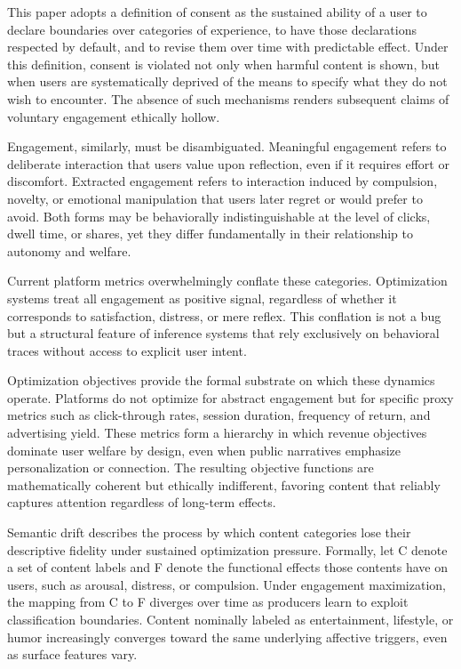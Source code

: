 \documentclass[11pt,oneside]{article}
\begin{document}
This paper adopts a definition of consent as the sustained ability of a user to declare boundaries over categories of experience, to have those declarations respected by default, and to revise them over time with predictable effect. Under this definition, consent is violated not only when harmful content is shown, but when users are systematically deprived of the means to specify what they do not wish to encounter. The absence of such mechanisms renders subsequent claims of voluntary engagement ethically hollow.

Engagement, similarly, must be disambiguated. Meaningful engagement refers to deliberate interaction that users value upon reflection, even if it requires effort or discomfort. Extracted engagement refers to interaction induced by compulsion, novelty, or emotional manipulation that users later regret or would prefer to avoid. Both forms may be behaviorally indistinguishable at the level of clicks, dwell time, or shares, yet they differ fundamentally in their relationship to autonomy and welfare.

Current platform metrics overwhelmingly conflate these categories. Optimization systems treat all engagement as positive signal, regardless of whether it corresponds to satisfaction, distress, or mere reflex. This conflation is not a bug but a structural feature of inference systems that rely exclusively on behavioral traces without access to explicit user intent.

Optimization objectives provide the formal substrate on which these dynamics operate. Platforms do not optimize for abstract engagement but for specific proxy metrics such as click-through rates, session duration, frequency of return, and advertising yield. These metrics form a hierarchy in which revenue objectives dominate user welfare by design, even when public narratives emphasize personalization or connection. The resulting objective functions are mathematically coherent but ethically indifferent, favoring content that reliably captures attention regardless of long-term effects.

Semantic drift describes the process by which content categories lose their descriptive fidelity under sustained optimization pressure. Formally, let C denote a set of content labels and F denote the functional effects those contents have on users, such as arousal, distress, or compulsion. Under engagement maximization, the mapping from C to F diverges over time as producers learn to exploit classification boundaries. Content nominally labeled as entertainment, lifestyle, or humor increasingly converges toward the same underlying affective triggers, even as surface features vary.
\end{document}
